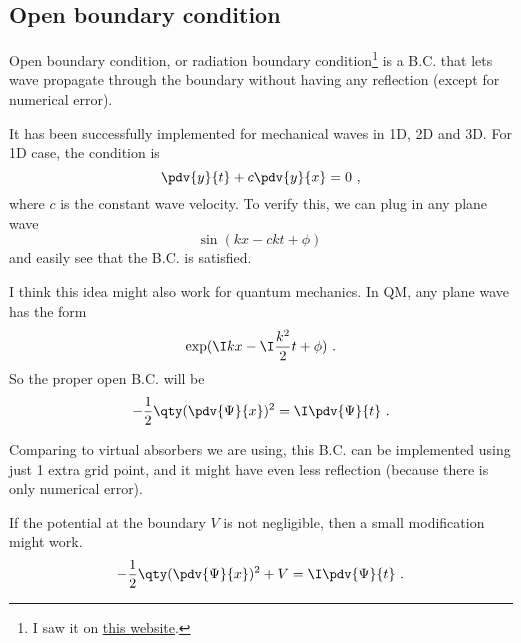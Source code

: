 
\begin{issues}
\issueDraft
\end{issues}



\subsection{Open boundary condition}

Open boundary condition, or radiation boundary condition\footnote{I saw it on \href{http://hplgit.github.io/num-methods-for-PDEs/doc/pub/wave/sphinx/._main_wave003.html#problem-11-implement-open-boundary-conditions}{this website}.} is a B.C. that lets wave propagate through the boundary without having any reflection (except for numerical error).

It has been successfully implemented for mechanical waves in 1D, 2D and 3D. For 1D case, the condition is
\begin{equation}
\pdv{y}{t} + c\pdv{y}{x} = 0~,
\end{equation}
where $c$ is the constant wave velocity. To verify this, we can plug in any plane wave
\begin{equation}
\sin(kx - ckt + \phi)~
\end{equation}
and easily see that the B.C. is satisfied.

I think this idea might also work for quantum mechanics. In QM, any plane wave has the form
\begin{equation}
\exp(\I kx - \I \frac{k^2}{2}t + \phi)~.
\end{equation}
So the proper open B.C. will be
\begin{equation}
-\frac12 \qty(\pdv{\Psi}{x})^2 = \I \pdv{\Psi}{t}~.
\end{equation}

Comparing to virtual absorbers we are using, this B.C. can be implemented using just 1 extra grid point, and it might have even less reflection (because there is only numerical error).

If the potential at the boundary $V$ is not negligible, then a small modification might work.
\begin{equation}
-\frac12 \qty(\pdv{\Psi}{x})^2 + V = \I \pdv{\Psi}{t}~.
\end{equation}
